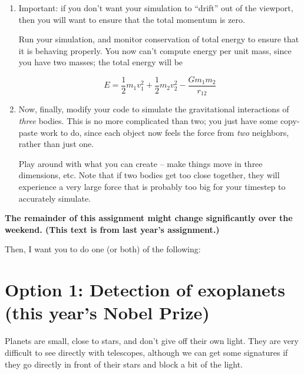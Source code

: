 \documentclass[12pt]{article}
\begin{document}
\begin{enumerate}
\item Important: if you don't want your simulation to ``drift'' out of the viewport, 
then you will want to ensure that the total momentum is zero.

   Run your simulation, and monitor conservation of total energy to ensure that it is behaving properly. You now can't compute energy per unit mass, since you have two masses; the total energy will be

   \begin{equation}
     E = \frac{1}{2}m_1v_1^2 + \frac{1}{2}m_2v_2^2 - \frac{Gm_1m_2}{r_{12}}
   \end{equation}

\item Now, finally, modify your code to simulate the gravitational interactions of {\it 
three} bodies. This is no more complicated than two; you just have some copy-paste work
to do, since each object now feels the force from {\it two} neighbors, rather than just one.

Play around with what you can create -- make things move in three dimensions, etc. Note that if two bodies get too close together,
they will experience a very large force that is probably too big for your timestep to accurately simulate. 

  \end{enumerate}

\bigskip

\begin{center}
{\bf The remainder of this assignment might change significantly over the weekend. (This text is from last year's assignment.)}
\end{center}

\bigskip

Then, I want you to do one (or both) of the following:

\section{Option 1: Detection of exoplanets (this year's Nobel Prize)}

Planets are small, close to stars, and don't give off their own light. They are very difficult to see directly with telescopes, although we can get some signatures if they go directly in front of their stars and block a bit of the light.
\end{document}
